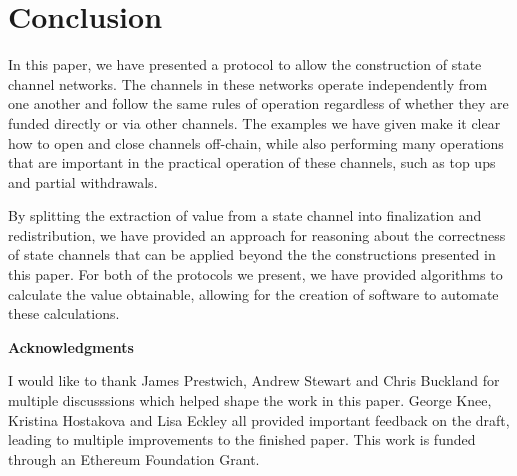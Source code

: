 \section{Conclusion}

In this paper, we have presented a protocol to allow the construction of state channel networks.
The channels in these networks operate independently from one another and follow the same rules of operation regardless of whether they are funded directly or via other channels.
The examples we have given make it clear how to open and close channels off-chain, while also performing many operations that are important in the practical operation of these channels, such as top ups and partial withdrawals.

By splitting the extraction of value from a state channel into finalization and redistribution, we have provided an approach for reasoning about the correctness of state channels that can be applied beyond the the constructions presented in this paper.
For both of the protocols we present, we have provided algorithms to calculate the value obtainable, allowing for the creation of software to automate these calculations.



\textbf{Acknowledgments}

I would like to thank James Prestwich, Andrew Stewart and Chris Buckland for multiple discusssions which helped shape the work in this paper. 
George Knee, Kristina Hostakova and Lisa Eckley all provided important feedback on the draft, leading to multiple improvements to the finished paper.
This work is funded through an Ethereum Foundation Grant.
